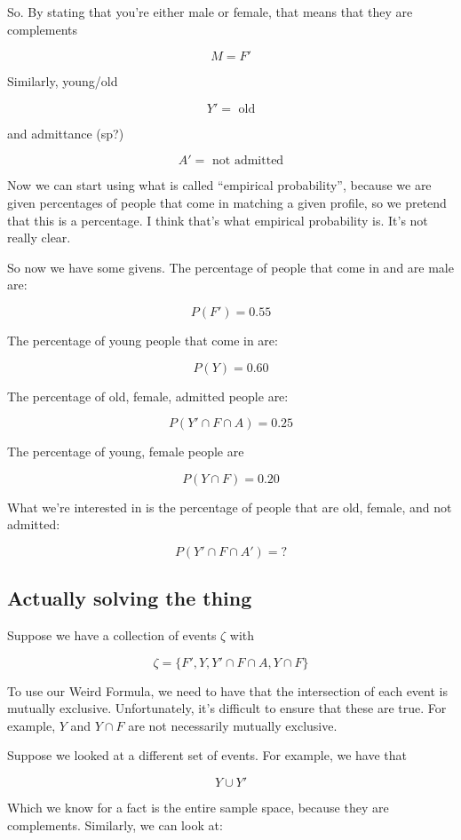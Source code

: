 \documentclass{article}
\begin{document}
So. By stating that you're either male or female, that means that they
are complements

\[
M = F'
\]

Similarly, young/old

\[
Y'=\text{ old}
\]

and admittance (sp?)

\[
A'=\text{ not admitted}
\]

Now we can start using what is called ``empirical probability'',
because we are given percentages of people that come in matching a
given profile, so we pretend that this is a percentage. I think that's
what empirical probability is. It's not really clear.

So now we have some givens. The percentage of people that come in and
are male are:

\[
P(F')=0.55
\]

The percentage of young people that come in are:

\[
P(Y)=0.60
\]

The percentage of old, female, admitted people are:

\[
P(Y'\cap F\cap A)=0.25
\]

The percentage of young, female people are

\[
P(Y\cap F)=0.20
\]

What we're interested in is the percentage of people that are old,
female, and not admitted:

\[
P(Y'\cap F\cap A') = ?
\]

\subsection*{Actually solving the thing}

Suppose we have a collection of events $\zeta$ with

\[
\zeta = \{F', Y, Y'\cap F\cap A, Y\cap F\}
\]

To use our Weird Formula, we need to have that the intersection of
each event is mutually exclusive. Unfortunately, it's difficult to
ensure that these are true. For example, $Y$ and $Y\cap{}F$ are not
necessarily mutually exclusive.

Suppose we looked at a different set of events. For example, we have
that

\[
Y\cup Y'
\]

Which we know for a fact is the entire sample space, because they are
complements. Similarly, we can look at:
\end{document}
